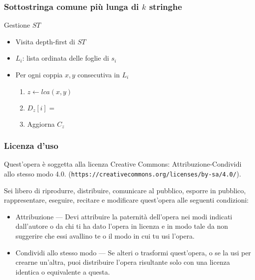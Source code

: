 \begin{frame}[fragile]
	\frametitle{Sottostringa comune più lunga di $k$ stringhe}
	\begin{block}{Gestione $ST$}
		\begin{itemize}
			\item
			      Visita depth-first di $ST$
			\item
			      $L_{i}$: lista ordinata delle foglie di $s_{i}$
			\item
			      Per ogni coppia $x,y$ consecutiva in $L_{i}$
			      \begin{enumerate}
				      \item
				            $z\gets lca(x,y)$
				      \item
				            $D_{z}[i]=$
				      \item
				            Aggiorna $C_{z}$
			      \end{enumerate}
		\end{itemize}
	\end{block}
\end{frame}


\begin{frame}[containsverbatim]\frametitle{Licenza d'uso}
	\small

	Quest'opera {\`e} soggetta alla licenza Creative Commons:
	Attribuzione-Condividi allo stesso modo 4.0.
	(\verb+https://creativecommons.org/licenses/by-sa/4.0/+).

	Sei libero di riprodurre, distribuire, comunicare al pubblico, esporre
	in pubblico, rappresentare, eseguire, recitare e modificare quest'opera
	alle seguenti condizioni:
	\begin{itemize}
		\item
		      Attribuzione — Devi attribuire la paternit{\`a} dell'opera nei modi
		      indicati dall'autore o da chi ti ha dato l'opera in licenza e in modo tale da
		      non suggerire che essi avallino te o il modo in cui tu usi l'opera.
		\item
		      Condividi allo stesso modo — Se alteri o trasformi quest'opera, o se
		      la usi per crearne un'altra, puoi distribuire l'opera risultante solo con
		      una licenza identica o equivalente a  questa.
	\end{itemize}
\end{frame}


